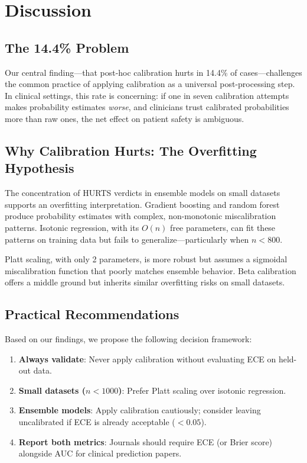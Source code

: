 \documentclass[preprint,12pt]{elsarticle}
\begin{document}
\section{Discussion}
\label{sec:discussion}

\subsection{The 14.4\% Problem}

Our central finding---that post-hoc calibration hurts in 14.4\% of cases---challenges the common practice of applying calibration as a universal post-processing step. In clinical settings, this rate is concerning: if one in seven calibration attempts makes probability estimates \emph{worse}, and clinicians trust calibrated probabilities more than raw ones, the net effect on patient safety is ambiguous.

\subsection{Why Calibration Hurts: The Overfitting Hypothesis}

The concentration of HURTS verdicts in ensemble models on small datasets supports an overfitting interpretation. Gradient boosting and random forest produce probability estimates with complex, non-monotonic miscalibration patterns. Isotonic regression, with its $O(n)$ free parameters, can fit these patterns on training data but fails to generalize---particularly when $n<800$.

Platt scaling, with only 2 parameters, is more robust but assumes a sigmoidal miscalibration function that poorly matches ensemble behavior. Beta calibration offers a middle ground but inherits similar overfitting risks on small datasets.

\subsection{Practical Recommendations}

Based on our findings, we propose the following decision framework:

\begin{enumerate}
    \item \textbf{Always validate}: Never apply calibration without evaluating ECE on held-out data.
    \item \textbf{Small datasets ($n<1000$)}: Prefer Platt scaling over isotonic regression.
    \item \textbf{Ensemble models}: Apply calibration cautiously; consider leaving uncalibrated if ECE is already acceptable ($<0.05$).
    \item \textbf{Report both metrics}: Journals should require ECE (or Brier score) alongside AUC for clinical prediction papers.
\end{enumerate}
\end{document}
